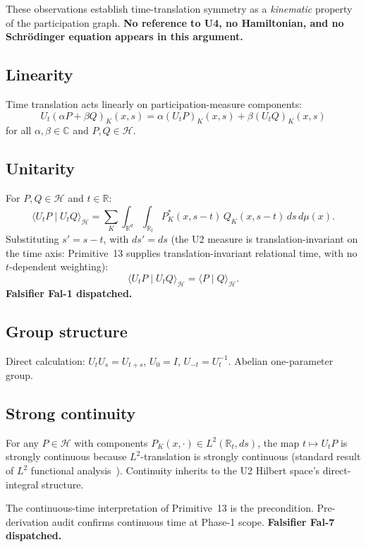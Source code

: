 \documentclass[11pt,a4paper]{article}
\begin{document}
These observations establish time-translation symmetry as a \emph{kinematic} property of the participation graph. \textbf{No reference to U4, no Hamiltonian, and no Schr\"odinger equation appears in this argument.}

\subsection{Linearity}

Time translation acts linearly on participation-measure components:
\[
U_t (\alpha P + \beta Q)_K(x, s) = \alpha (U_t P)_K(x, s) + \beta (U_t Q)_K(x, s)
\]
for all $\alpha, \beta \in \mathbb{C}$ and $P, Q \in \mathcal{H}$.

\subsection{Unitarity}

For $P, Q \in \mathcal{H}$ and $t \in \mathbb{R}$:
\[
\langle U_t P \mid U_t Q \rangle_{\mathcal{H}} = \sum_K \int_{\mathbb{R}^d} \int_{\mathbb{R}_t} P_K^*(x, s - t) \, Q_K(x, s - t) \, ds \, d\mu(x).
\]
Substituting $s' = s - t$, with $ds' = ds$ (the U2 measure is translation-invariant on the time axis: Primitive~13 supplies translation-invariant relational time, with no $t$-dependent weighting):
\[
\langle U_t P \mid U_t Q \rangle_{\mathcal{H}} = \langle P \mid Q \rangle_{\mathcal{H}}.
\]
\textbf{Falsifier Fal-1 dispatched.}

\subsection{Group structure}

Direct calculation: $U_t U_s = U_{t+s}$, $U_0 = I$, $U_{-t} = U_t^{-1}$. Abelian one-parameter group.

\subsection{Strong continuity}

For any $P \in \mathcal{H}$ with components $P_K(x, \cdot) \in L^2(\mathbb{R}_t, ds)$, the map $t \mapsto U_t P$ is strongly continuous because $L^2$-translation is strongly continuous (standard result of $L^2$ functional analysis~\cite{reedsimon}). Continuity inherits to the U2 Hilbert space's direct-integral structure.

The continuous-time interpretation of Primitive~13 is the precondition. Pre-derivation audit confirms continuous time at Phase-1 scope. \textbf{Falsifier Fal-7 dispatched.}
\end{document}
